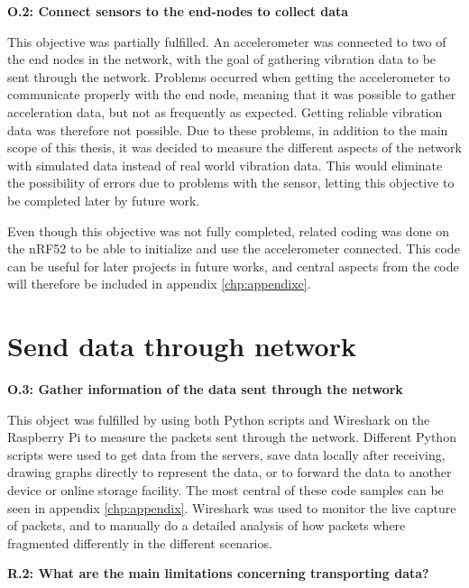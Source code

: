 \noindent\textbf{O.2: Connect sensors to the end-nodes to collect data}

\noindent This objective was partially fulfilled. An accelerometer was connected to two of the end nodes in the network, with the goal of gathering vibration data to be sent through the network. Problems occurred when getting the accelerometer to communicate properly with the end node, meaning that it was possible to gather acceleration data, but not as frequently as expected. Getting reliable vibration data was therefore not possible. Due to these problems, in addition to the main scope of this thesis, it was decided to measure the different aspects of the network with simulated data instead of real world vibration data. This would eliminate the possibility of errors due to problems with the sensor, letting this objective to be completed later by future work. 

\noindent Even though this objective was not fully completed, related coding was done on the \gls{nRF52} to be able to initialize and use the accelerometer connected. This code can be useful for later projects in future works, and central aspects from the code will therefore be included in appendix \ref{chp:appendixc}.  



\section{Send data through network}

\noindent\textbf{O.3: Gather information of the data sent through the network}

\noindent This object was fulfilled by using both Python scripts and Wireshark on the \gls{Raspberry Pi} to measure the packets sent through the network. Different Python scripts were used to get data from the servers, save data locally after receiving, drawing graphs directly to represent the data, or to forward the data to another device or online storage facility. The most central of these code samples can be seen in appendix \ref{chp:appendix}. Wireshark was used to monitor the live capture of packets, and to manually do a detailed analysis of how packets where fragmented differently in the different scenarios. 

\noindent\textbf{R.2: What are the main limitations concerning transporting data?}

